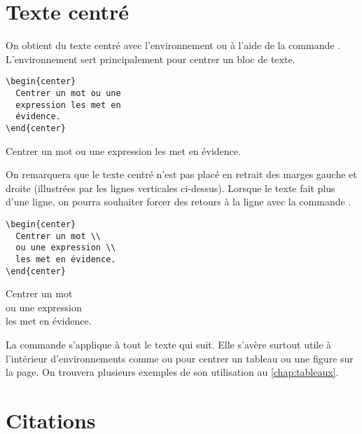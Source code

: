 \section{Texte centré}
\label{sec:apparence:centering}

On obtient du texte centré avec l'environnement  ou à
l'aide de la commande \cmd{\centering}. L'environnement sert
principalement pour centrer un bloc de texte.
\begin{demo}
  \begin{eqxample}
\begin{lstlisting}
\begin{center}
  Centrer un mot ou une
  expression les met en
  évidence.
\end{center}
\end{lstlisting}
    \producing
\begin{center}
  Centrer un mot ou une expression
  les met en évidence.
\end{center}
  \end{eqxample}
\end{demo}
On remarquera que le texte centré n'est pas placé en retrait des
marges gauche et droite (illustrées par les lignes verticales
ci-dessus). Lorsque le texte fait plus d'une ligne, on pourra
souhaiter forcer des retours à la ligne avec la commande {\bs\bs}.
\begin{demo}
  \begin{eqxample}
\begin{lstlisting}
\begin{center}
  Centrer un mot \\
  ou une expression \\
  les met en évidence.
\end{center}
\end{lstlisting}
    \producing
\begin{center}
  Centrer un mot \\
  ou une expression \\
  les met en évidence.
\end{center}
  \end{eqxample}
\end{demo}

La commande \cmd{\centering} s'applique à tout le texte qui suit. Elle
s'avère surtout utile à l'intérieur d'environnements comme 
ou  pour centrer un tableau ou une figure sur la page. On
trouvera plusieurs exemples de son utilisation
au \autoref{chap:tableaux}.


\section{Citations}
\label{sec:apparence:citations}

